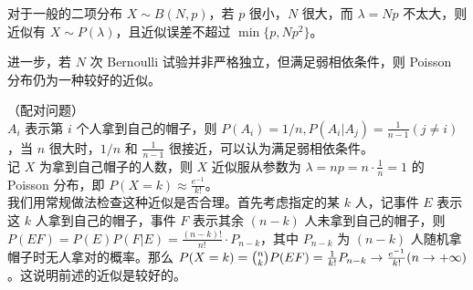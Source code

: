 \documentclass[../main.tex]{subfiles}
\begin{document}
对于一般的二项分布 $X\sim B(N,p)$，若 $p$ 很小，$N$ 很大，而 $\lambda=Np$ 不太大，则近似有 $X\sim P(\lambda)$，且近似误差不超过 $\min\{p,Np^2\}$。

进一步，若 $N$ 次 Bernoulli 试验并非严格独立，但满足弱相依条件，则 Poisson 分布仍为一种较好的近似。

\begin{example}
    （配对问题）\\
    $A_i$ 表示第 $i$ 个人拿到自己的帽子，则 $P(A_i)=1/n,P(A_i|A_j)=\frac{1}{n-1}(j\neq i)$，当 $n$ 很大时，$1/n$ 和 $\frac{1}{n-1}$ 很接近，可以认为满足弱相依条件。\\
    记 $X$ 为拿到自己帽子的人数，则 $X$ 近似服从参数为 $\lambda=np=n\cdot\frac{1}{n}=1$ 的 Poisson 分布，即 $P(X=k)\approx\frac{e^{-1}}{k!}$。\\
    我们用常规做法检查这种近似是否合理。首先考虑指定的某 $k$ 人，记事件 $E$ 表示这 $k$ 人拿到自己的帽子，事件 $F$ 表示其余 $(n-k)$ 人未拿到自己的帽子，则 $P(EF)=P(E)P(F|E)=\frac{(n-k)!}{n!}\cdot P_{n-k}$，其中 $P_{n-k}$ 为 $(n-k)$ 人随机拿帽子时无人拿对的概率。那么 $P(X=k)=\tbinom{n}{k}P(EF)=\frac{1}{k!}P_{n-k}\rightarrow\frac{e^{-1}}{k!}(n\rightarrow+\infty)$。这说明前述的近似是较好的。
\end{example}
\end{document}

